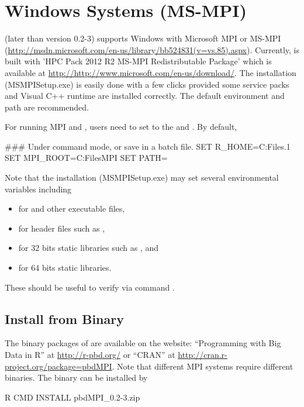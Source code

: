 

\section[Windows Systems (MS-MPI)]{Windows Systems (MS-MPI)}
\label{sec:windows_systems_msmpi}

 (later than version 0.2-3) supports Windows with
Microsoft MPI or MS-MPI
(\url{http://msdn.microsoft.com/en-us/library/bb524831(v=vs.85).aspx}).
Currently,  is built with
'HPC Pack 2012 R2 MS-MPI Redistributable Package' which is available
at \url{http://http://www.microsoft.com/en-us/download/}.
The installation (MSMPISetup.exe) is easily done with a few clicks
provided some service packs and Visual C++ runtime are installed correctly.
The default environment and path are recommended.

For running MPI and , users need to set  to the
 and . By default,
\begin{Command}
### Under command mode, or save in a batch file.
SET R_HOME=C:\Program Files\R{}.1
SET MPI_ROOT=C:\Program Files\Microsoft MPI
SET PATH=%
\end{Command}

Note that the installation (MSMPISetup.exe) may set
several environmental variables including
\begin{itemize}
\item {} for  and other executable files,
\item {} for header files such as ,
\item {} for 32 bits static libraries such as ,
      and
\item {} for 64 bits static libraries.
\end{itemize}
These should be useful to verify via  command .


\subsection[Install from Binary]{Install from Binary}
\label{sec:install_from_binary}

The binary packages of  are available on the website:
``Programming with Big Data in R'' at
\url{http://r-pbd.org/} or
``CRAN'' at
\url{http://cran.r-project.org/package=pbdMPI}.
Note that different MPI systems require different binaries.
The binary can be installed by
\begin{Command}
R CMD INSTALL pbdMPI_0.2-3.zip
\end{Command}

